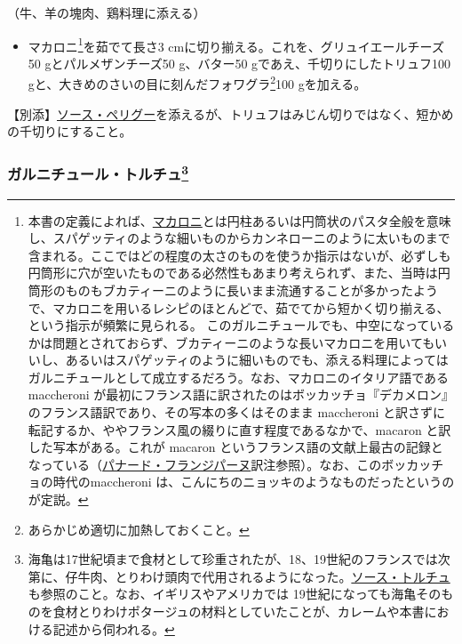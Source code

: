 \begin{recette}


（牛、羊の塊肉、鶏料理に添える）

\begin{itemize}
\tightlist
\item
  マカロニ\footnote{本書の定義によれば、\protect\hyperlink{macaroni}{マカロニ}とは円柱あるいは円筒状のパスタ全般を意味し、スパゲッティのような細いものからカンネローニのように太いものまで含まれる。ここではどの程度の太さのものを使うか指示はないが、必ずしも円筒形に穴が空いたものである必然性もあまり考えられず、また、当時は円筒形のものもブカティーニのように長いまま流通することが多かったようで、マカロニを用いるレシピのほとんどで、茹でてから短かく切り揃える、という指示が頻繁に見られる。
    このガルニチュールでも、中空になっているかは問題とされておらず、ブカティーニのような長いマカロニを用いてもいいし、あるいはスパゲッティのように細いものでも、添える料理によってはガルニチュールとして成立するだろう。なお、マカロニのイタリア語である
    maccheroni
    が最初にフランス語に訳されたのはボッカッチョ『デカメロン』のフランス語訳であり、その写本の多くはそのまま
    maccheroni
    と訳さずに転記するか、ややフランス風の綴りに直す程度であるなかで、macaron
    と訳した写本がある。これが macaron
    というフランス語の文献上最古の記録となっている（\protect\hyperlink{panade-frangipane}{パナード・フランジパーヌ}訳注参照）。なお、このボッカッチョの時代のmaccheroni
    は、こんにちのニョッキのようなものだったというのが定説。}を茹でて長さ3
  cmに切り揃える。これを、グリュイエールチーズ50 gとパルメザンチーズ50
  g、バター50 gであえ、千切りにしたトリュフ100
  gと、大きめのさいの目に刻んだフォワグラ\footnote{あらかじめ適切に加熱しておくこと。}100
  gを加える。
\end{itemize}

【別添】\protect\hyperlink{sauce-perigueux}{ソース・ペリグー}を添えるが、トリュフはみじん切りではなく、短かめの千切りにすること。

\atoaki{}

\hypertarget{garniture-tortue}{%
\subsubsection[ガルニチュール・トルチュ]{\texorpdfstring{ガルニチュール・トルチュ\footnote{海亀は17世紀頃まで食材として珍重されたが、18、19世紀のフランスでは次第に、仔牛肉、とりわけ頭肉で代用されるようになった。\protect\hyperlink{sauce-tortue}{ソース・トルチュ}も参照のこと。なお、イギリスやアメリカでは
  19世紀になっても海亀そのものを食材とりわけポタージュの材料としていたことが、カレームや本書における記述から伺われる。}}{ガルニチュール・トルチュ}}\label{garniture-tortue}}


\end{recette}
